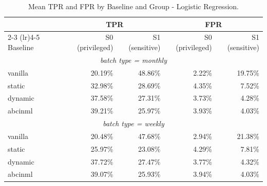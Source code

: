 \begin{table}
  \caption{Mean TPR and FPR by Baseline and Group - Logistic Regression.}
  \label{tab:absolute-rates-lr}
  \begin{tabular}{lrrrr}
    \toprule
     & \multicolumn{2}{c}{TPR} & \multicolumn{2}{c}{FPR} \\
    \cmidrule(lr){2-3} \cmidrule(lr){4-5}
    Baseline & S0 (privileged) & S1 (sensitive) & S0 (privileged) & S1 (sensitive) \\
    \midrule
    \multicolumn{5}{c}{\textit{batch type = monthly}} \\
    \midrule
    vanilla & 20.19\% & 48.86\% & 2.22\% & 19.75\% \\
    static & 32.98\% & 28.69\% & 4.35\% & 7.52\% \\
    dynamic & 37.58\% & 27.31\% & 3.73\% & 4.28\% \\
    abcinml & 39.21\% & 25.97\% & 3.93\% & 4.03\% \\
    \midrule
    \multicolumn{5}{c}{\textit{batch type = weekly}} \\
    \midrule
    vanilla & 20.48\% & 47.68\% & 2.94\% & 21.38\% \\
    static & 25.97\% & 23.08\% & 4.29\% & 7.81\% \\
    dynamic & 37.72\% & 27.47\% & 3.77\% & 4.32\% \\
    abcinml & 39.07\% & 25.93\% & 3.94\% & 4.03\% \\
    \bottomrule
  \end{tabular}
\end{table}

